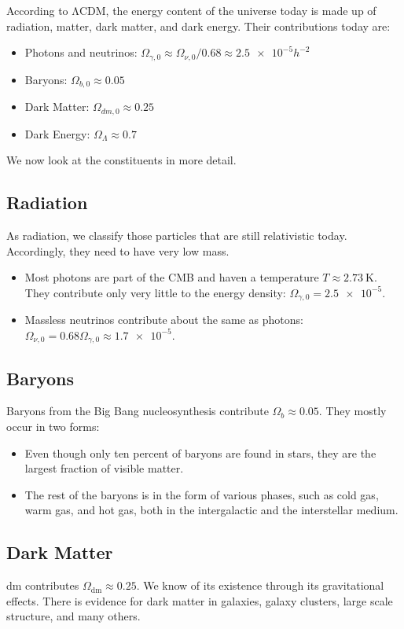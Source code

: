 According to ΛCDM, the energy content of the universe today is made up of radiation, matter, dark matter, and dark energy. Their contributions today are:
\begin{itemize}
	\item Photons and neutrinos: $\Omega_{\gamma,0} \approx \Omega_{\nu,0}/0.68 \approx \num{2.5e-5} h^{-2}$
	\item Baryons:  $\Omega_{b,0} \approx 0.05$
	\item Dark Matter: $\Omega_{dm,0} \approx 0.25$
	\item Dark Energy: $\Omega_\Lambda \approx 0.7$
\end{itemize}
We now look at the constituents in more detail.

\subsection*{Radiation}

As radiation, we classify those particles that are still relativistic today. Accordingly, they need to have very low mass.
\begin{itemize}
	\item Most photons are part of the CMB and haven a temperature $T\approx \SI{2.73}{\kelvin}$. They contribute only very little to the energy density: $\Omega_{\gamma,0} = \num{2.5e-5}$.
	\item Massless neutrinos contribute about the same as photons: $\Omega_{\nu,0} = 0.68 \Omega_{\gamma,0} \approx \num{1.7e-5}$.
\end{itemize}

\subsection*{Baryons}
Baryons from the Big Bang nucleosynthesis contribute $\Omega_b \approx 0.05$. They mostly occur in two forms:
\begin{itemize}
	\item Even though only ten percent of baryons are found in stars, they are the largest fraction of visible matter.
	\item The rest of the baryons is in the form of various phases, such as cold gas, warm gas, and hot gas, both in the intergalactic and the interstellar medium.
\end{itemize}

\subsection*{Dark Matter}
\Ac{dm} contributes $\Omega_\text{dm} \approx 0.25$. We know of its existence through its gravitational effects. There is evidence for dark matter in galaxies, galaxy clusters, large scale structure, and many others.

